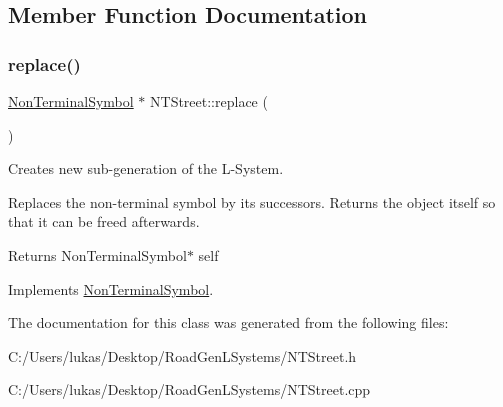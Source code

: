 \subsection{Member Function Documentation}
\hypertarget{class_n_t_street_ac3aa05ca530c99b178a855fc736b1a76}{}\label{class_n_t_street_ac3aa05ca530c99b178a855fc736b1a76} 
\subsubsection{\texorpdfstring{replace()}{replace()}}
{\footnotesize\ttfamily \hyperlink{class_non_terminal_symbol}{Non\+Terminal\+Symbol} $\ast$ N\+T\+Street\+::replace (\begin{DoxyParamCaption}{ }\end{DoxyParamCaption})\hspace{0.3cm}{\ttfamily [virtual]}}



Creates new sub-\/generation of the L-\/\+System. 

Replaces the non-\/terminal symbol by its successors. Returns the object itself so that it can be freed afterwards.

\begin{DoxyReturn}{Returns}
Non\+Terminal\+Symbol$\ast$ self 
\end{DoxyReturn}


Implements \hyperlink{class_non_terminal_symbol_ade38f1475002e4f8b41e23d9c787e5e0}{Non\+Terminal\+Symbol}.



The documentation for this class was generated from the following files\+:\begin{DoxyCompactItemize}
\item 
C\+:/\+Users/lukas/\+Desktop/\+Road\+Gen\+L\+Systems/N\+T\+Street.\+h\item 
C\+:/\+Users/lukas/\+Desktop/\+Road\+Gen\+L\+Systems/N\+T\+Street.\+cpp\end{DoxyCompactItemize}
